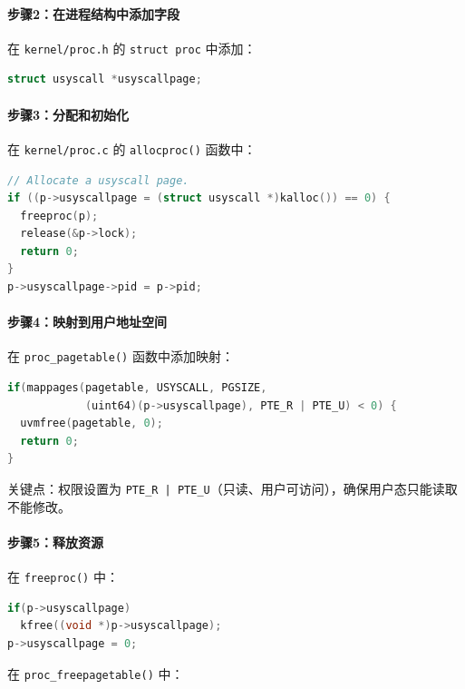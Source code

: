 \paragraph{步骤2：在进程结构中添加字段}

在 \texttt{kernel/proc.h} 的 \texttt{struct proc} 中添加：

\begin{lstlisting}[language=C]
struct usyscall *usyscallpage;
\end{lstlisting}

\paragraph{步骤3：分配和初始化}

在 \texttt{kernel/proc.c} 的 \texttt{allocproc()} 函数中：

\begin{lstlisting}[language=C]
// Allocate a usyscall page.
if ((p->usyscallpage = (struct usyscall *)kalloc()) == 0) {
  freeproc(p);
  release(&p->lock);
  return 0;
}
p->usyscallpage->pid = p->pid;
\end{lstlisting}

\paragraph{步骤4：映射到用户地址空间}

在 \texttt{proc\_pagetable()} 函数中添加映射：

\begin{lstlisting}[language=C]
if(mappages(pagetable, USYSCALL, PGSIZE, 
            (uint64)(p->usyscallpage), PTE_R | PTE_U) < 0) {
  uvmfree(pagetable, 0);
  return 0;
}
\end{lstlisting}

关键点：权限设置为 \texttt{PTE\_R | PTE\_U}（只读、用户可访问），确保用户态只能读取不能修改。

\paragraph{步骤5：释放资源}

在 \texttt{freeproc()} 中：

\begin{lstlisting}[language=C]
if(p->usyscallpage)
  kfree((void *)p->usyscallpage);
p->usyscallpage = 0;
\end{lstlisting}

在 \texttt{proc\_freepagetable()} 中：

